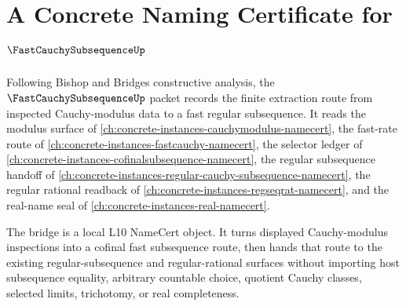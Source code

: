 \chapter{A Concrete Naming Certificate for $\FastCauchySubsequenceUp$}
\label{ch:concrete-instances-fastcauchysubsequence-namecert}

Following Bishop and Bridges constructive analysis, the $\FastCauchySubsequenceUp$ packet records the finite extraction route from inspected Cauchy-modulus data to a fast regular subsequence. It reads the modulus surface of \autoref{ch:concrete-instances-cauchymodulus-namecert}, the fast-rate route of \autoref{ch:concrete-instances-fastcauchy-namecert}, the selector ledger of \autoref{ch:concrete-instances-cofinalsubsequence-namecert}, the regular subsequence handoff of \autoref{ch:concrete-instances-regular-cauchy-subsequence-namecert}, the regular rational readback of \autoref{ch:concrete-instances-regseqrat-namecert}, and the real-name seal of \autoref{ch:concrete-instances-real-namecert}.

The bridge is a local L10 NameCert object. It turns displayed Cauchy-modulus inspections into a cofinal fast subsequence route, then hands that route to the existing regular-subsequence and regular-rational surfaces without importing host subsequence equality, arbitrary countable choice, quotient Cauchy classes, selected limits, trichotomy, or real completeness.

